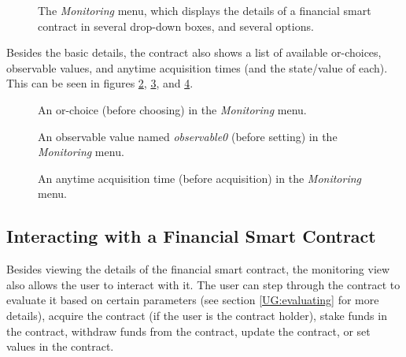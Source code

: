 \begin{figure}[h]
    \centering
    \caption{The \textit{Monitoring} menu, which displays the details of a financial smart contract in several drop-down boxes, and several options.}
    \label{UG:fig:monitoring}
\end{figure}

Besides the basic details, the contract also shows a list of available or-choices, observable values, and anytime acquisition times (and the state/value of each). This can be seen in figures \ref{UG:fig:monitoring-or}, \ref{UG:fig:monitoring-obs}, and \ref{UG:fig:monitoring-anytime}.

\begin{figure}[h]
    \centering
    \caption{An or-choice (before choosing) in the \textit{Monitoring} menu.}
    \label{UG:fig:monitoring-or}
\end{figure}

\begin{figure}[h]
    \centering
    \caption{An observable value named \textit{observable0} (before setting) in the \textit{Monitoring} menu.}
    \label{UG:fig:monitoring-obs}
\end{figure}

\begin{figure}[h]
    \centering
    \caption{An anytime acquisition time (before acquisition) in the \textit{Monitoring} menu.}
    \label{UG:fig:monitoring-anytime}
\end{figure}

\subsection{Interacting with a Financial Smart Contract}

Besides viewing the details of the financial smart contract, the monitoring view also allows the user to interact with it. The user can step through the contract to evaluate it based on certain parameters (see section \ref{UG:evaluating} for more details), acquire the contract (if the user is the contract holder), stake funds in the contract, withdraw funds from the contract, update the contract, or set values in the contract.


